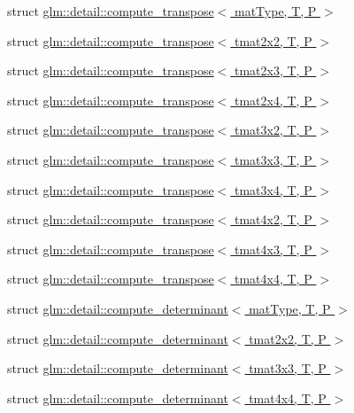 \begin{DoxyCompactItemize}
\item 
struct \hyperlink{structglm_1_1detail_1_1compute__transpose}{glm\-::detail\-::compute\-\_\-transpose$<$ mat\-Type, T, P $>$}
\item 
struct \hyperlink{structglm_1_1detail_1_1compute__transpose_3_01tmat2x2_00_01_t_00_01_p_01_4}{glm\-::detail\-::compute\-\_\-transpose$<$ tmat2x2, T, P $>$}
\item 
struct \hyperlink{structglm_1_1detail_1_1compute__transpose_3_01tmat2x3_00_01_t_00_01_p_01_4}{glm\-::detail\-::compute\-\_\-transpose$<$ tmat2x3, T, P $>$}
\item 
struct \hyperlink{structglm_1_1detail_1_1compute__transpose_3_01tmat2x4_00_01_t_00_01_p_01_4}{glm\-::detail\-::compute\-\_\-transpose$<$ tmat2x4, T, P $>$}
\item 
struct \hyperlink{structglm_1_1detail_1_1compute__transpose_3_01tmat3x2_00_01_t_00_01_p_01_4}{glm\-::detail\-::compute\-\_\-transpose$<$ tmat3x2, T, P $>$}
\item 
struct \hyperlink{structglm_1_1detail_1_1compute__transpose_3_01tmat3x3_00_01_t_00_01_p_01_4}{glm\-::detail\-::compute\-\_\-transpose$<$ tmat3x3, T, P $>$}
\item 
struct \hyperlink{structglm_1_1detail_1_1compute__transpose_3_01tmat3x4_00_01_t_00_01_p_01_4}{glm\-::detail\-::compute\-\_\-transpose$<$ tmat3x4, T, P $>$}
\item 
struct \hyperlink{structglm_1_1detail_1_1compute__transpose_3_01tmat4x2_00_01_t_00_01_p_01_4}{glm\-::detail\-::compute\-\_\-transpose$<$ tmat4x2, T, P $>$}
\item 
struct \hyperlink{structglm_1_1detail_1_1compute__transpose_3_01tmat4x3_00_01_t_00_01_p_01_4}{glm\-::detail\-::compute\-\_\-transpose$<$ tmat4x3, T, P $>$}
\item 
struct \hyperlink{structglm_1_1detail_1_1compute__transpose_3_01tmat4x4_00_01_t_00_01_p_01_4}{glm\-::detail\-::compute\-\_\-transpose$<$ tmat4x4, T, P $>$}
\item 
struct \hyperlink{structglm_1_1detail_1_1compute__determinant}{glm\-::detail\-::compute\-\_\-determinant$<$ mat\-Type, T, P $>$}
\item 
struct \hyperlink{structglm_1_1detail_1_1compute__determinant_3_01tmat2x2_00_01_t_00_01_p_01_4}{glm\-::detail\-::compute\-\_\-determinant$<$ tmat2x2, T, P $>$}
\item 
struct \hyperlink{structglm_1_1detail_1_1compute__determinant_3_01tmat3x3_00_01_t_00_01_p_01_4}{glm\-::detail\-::compute\-\_\-determinant$<$ tmat3x3, T, P $>$}
\item 
struct \hyperlink{structglm_1_1detail_1_1compute__determinant_3_01tmat4x4_00_01_t_00_01_p_01_4}{glm\-::detail\-::compute\-\_\-determinant$<$ tmat4x4, T, P $>$}
\end{DoxyCompactItemize}
